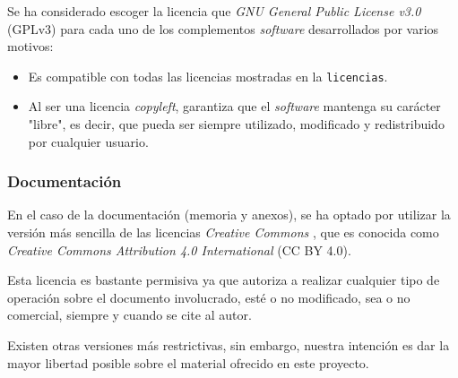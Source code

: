 Se ha considerado escoger la licencia que \emph{GNU General Public
License v3.0} \cite{gnu:web} (GPLv3) para cada uno de los complementos \emph{software}
desarrollados por varios motivos:

\begin{itemize}
\tightlist
\item
  Es compatible con todas las licencias mostradas en la
  \texttt{licencias}.
\item
  Al ser una licencia \emph{copyleft}, garantiza que el \emph{software}
  mantenga su carácter "libre", es decir, que pueda ser siempre
  utilizado, modificado y redistribuido por cualquier usuario.
\end{itemize}


\subsubsection{Documentación}

En el caso de la documentación (memoria y anexos), se ha optado por
utilizar la versión más sencilla de las licencias \emph{Creative
Commons} \cite{weboff:cc},
que es conocida como \emph{Creative Commons Attribution 4.0 International}
(CC BY 4.0).

Esta licencia es bastante permisiva ya que autoriza a realizar cualquier
tipo de operación sobre el documento involucrado, esté o no modificado,
sea o no comercial, siempre y cuando se cite al autor.

Existen otras versiones más restrictivas, sin embargo, nuestra intención
es dar la mayor libertad posible sobre el material ofrecido en este
proyecto.
